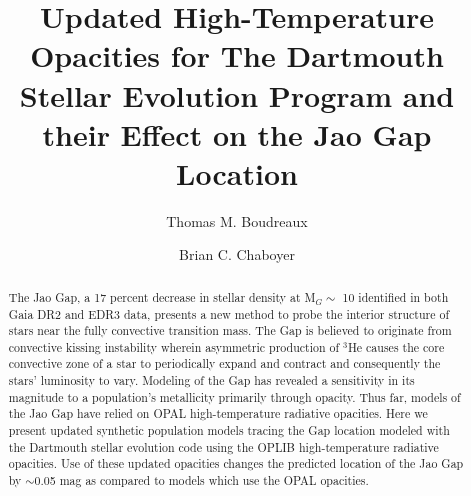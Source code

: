 \documentclass[twocolumn,linenumbers]{src/aastex631}
\begin{document}
\title{Updated High-Temperature Opacities for The Dartmouth Stellar Evolution
Program and their Effect on the Jao Gap Location}


\author[0000-0002-2600-7513]{Thomas M. Boudreaux}

\author[0000-0003-3096-4161]{Brian C. Chaboyer}


\begin{abstract}

	The Jao Gap, a 17 percent decrease in stellar density at M$_{G} \sim$ 10
	identified in both Gaia DR2 and EDR3 data, presents a new method to probe
	the interior structure of stars near the fully convective transition mass.
	The Gap is believed to originate from convective kissing instability
	wherein asymmetric production of $^{3}$He causes the core convective zone
	of a star to periodically expand and contract and consequently the stars’
	luminosity to vary. Modeling of the Gap has revealed a sensitivity in its
	magnitude to a population’s metallicity primarily through opacity. Thus
	far, models of the Jao Gap have relied on OPAL high-temperature radiative
	opacities. Here we present updated synthetic population models tracing the
	Gap location modeled with the Dartmouth stellar evolution code using the
	OPLIB high-temperature radiative opacities. Use of these updated opacities
	changes the predicted location of the Jao Gap by $\sim$0.05 mag as compared
	to models which use the OPAL opacities.

\end{abstract}















\end{document}
